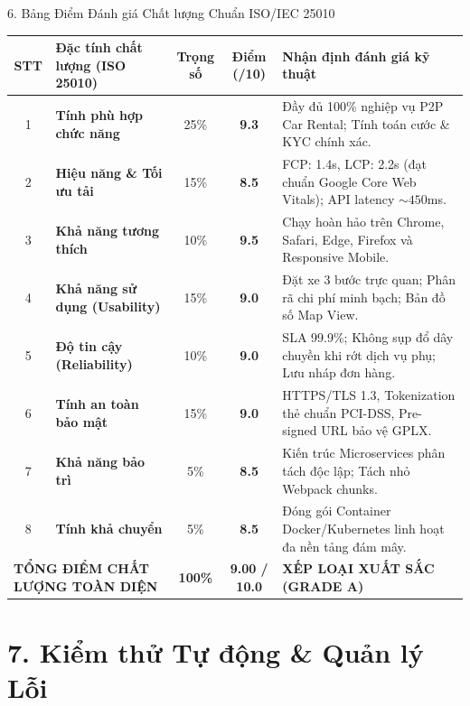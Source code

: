 \documentclass[aspectratio=169,10pt]{beamer}
\begin{document}
\begin{frame}{6. Bảng Điểm Đánh giá Chất lượng Chuẩn ISO/IEC 25010}
  \begin{table}[ht]
    \centering\footnotesize
    \begin{tabularx}{\textwidth}{clccX}
      \toprule
      \textbf{STT} & \textbf{Đặc tính chất lượng (ISO 25010)} & \textbf{Trọng số} & \textbf{Điểm (/10)} & \textbf{Nhận định đánh giá kỹ thuật} \\
      \midrule
      1 & \textbf{Tính phù hợp chức năng} & 25\% & \textbf{9.3} & Đầy đủ 100\% nghiệp vụ P2P Car Rental; Tính toán cước \& KYC chính xác. \\
      2 & \textbf{Hiệu năng \& Tối ưu tải} & 15\% & \textbf{8.5} & FCP: 1.4s, LCP: 2.2s (đạt chuẩn Google Core Web Vitals); API latency $\sim 450$ms. \\
      3 & \textbf{Khả năng tương thích} & 10\% & \textbf{9.5} & Chạy hoàn hảo trên Chrome, Safari, Edge, Firefox và Responsive Mobile. \\
      4 & \textbf{Khả năng sử dụng (Usability)} & 15\% & \textbf{9.0} & Đặt xe 3 bước trực quan; Phân rã chi phí minh bạch; Bản đồ số Map View. \\
      5 & \textbf{Độ tin cậy (Reliability)} & 10\% & \textbf{9.0} & SLA 99.9\%; Không sụp đổ dây chuyền khi rớt dịch vụ phụ; Lưu nháp đơn hàng. \\
      6 & \textbf{Tính an toàn bảo mật} & 15\% & \textbf{9.0} & HTTPS/TLS 1.3, Tokenization thẻ chuẩn PCI-DSS, Pre-signed URL bảo vệ GPLX. \\
      7 & \textbf{Khả năng bảo trì} & 5\% & \textbf{8.5} & Kiến trúc Microservices phân tách độc lập; Tách nhỏ Webpack chunks. \\
      8 & \textbf{Tính khả chuyển} & 5\% & \textbf{8.5} & Đóng gói Container Docker/Kubernetes linh hoạt đa nền tảng đám mây. \\
      \midrule
      \multicolumn{2}{l}{\textbf{TỔNG ĐIỂM CHẤT LƯỢNG TOÀN DIỆN}} & \textbf{100\%} & \textbf{9.00 / 10.0} & \textbf{XẾP LOẠI XUẤT SẮC (GRADE A)} \\
      \bottomrule
    \end{tabularx}
  \end{table}
\end{frame}

\section{7. Kiểm thử Tự động \& Quản lý Lỗi}
\end{document}
